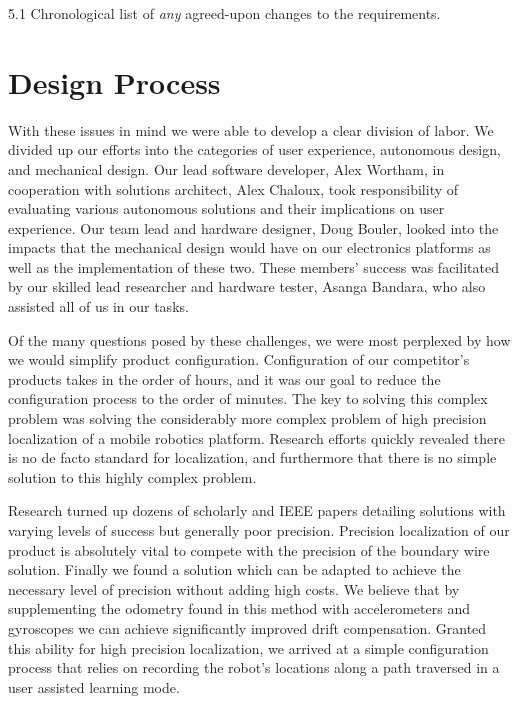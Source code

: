\documentclass[12pt,letterpaper]{article}
\begin{document}
5.1 Chronological list of \textit{any} agreed-upon changes to the requirements.

\section{Design Process}


With these issues in mind we were able to develop a clear division of labor.  We
divided up our efforts into the categories of user experience, autonomous
design, and mechanical design.  Our lead software developer, Alex Wortham, in
cooperation with solutions architect, Alex Chaloux, took responsibility of
evaluating various autonomous solutions and their implications on user
experience.  Our team lead and hardware designer, Doug Bouler, looked into the
impacts that the mechanical design would have on our electronics platforms as
well as the implementation of these two.  These members' success was facilitated
by our skilled lead researcher and hardware tester, Asanga Bandara, who also
assisted all of us in our tasks.

Of the many questions posed by these challenges, we were most perplexed by how
we would simplify product configuration.  Configuration of our competitor's
products takes in the order of hours, and it was our goal to reduce the
configuration process to the order of minutes.  The key to solving this complex
problem was solving the considerably more complex problem of high precision
localization of a mobile robotics platform.  Research efforts quickly revealed
there is no de facto standard for localization, and furthermore that there is no
simple solution to this highly complex problem.

Research turned up dozens of scholarly and IEEE papers detailing solutions with
varying levels of success but generally poor precision.  Precision localization
of our product is absolutely vital to compete with the precision of the boundary
wire solution.  Finally we found a solution which can be adapted to achieve the
necessary level of precision without adding high costs. \autocite{mobilegps}  We
believe that by supplementing the odometry found in this method with
accelerometers and gyroscopes we can achieve significantly improved drift
compensation. Granted this ability for high precision localization, we arrived
at a simple configuration process that relies on recording the robot's locations
along a path traversed in a user assisted learning mode.
\end{document}
